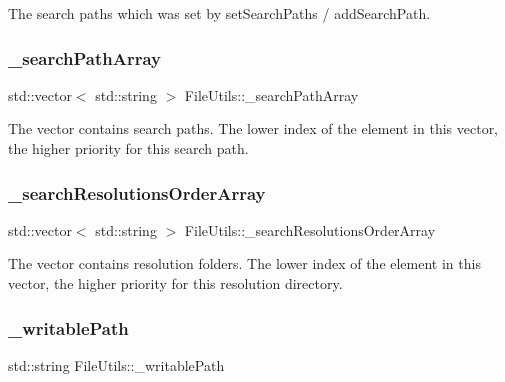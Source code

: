 The search paths which was set by \textquotesingle{}set\+Search\+Paths\textquotesingle{} / \textquotesingle{}add\+Search\+Path\textquotesingle{}. \mbox{\label{classFileUtils_a856a6d415b5bca3399d826e13ce23501}} 
\subsubsection{\texorpdfstring{\+\_\+search\+Path\+Array}{\_searchPathArray}}
{\footnotesize\ttfamily std\+::vector$<$ std\+::string $>$ File\+Utils\+::\+\_\+search\+Path\+Array\hspace{0.3cm}{\ttfamily [protected]}}

The vector contains search paths. The lower index of the element in this vector, the higher priority for this search path. \mbox{\label{classFileUtils_a35a01013ca9bcbb04c7ae1cd43fbe572}} 
\subsubsection{\texorpdfstring{\+\_\+search\+Resolutions\+Order\+Array}{\_searchResolutionsOrderArray}}
{\footnotesize\ttfamily std\+::vector$<$ std\+::string $>$ File\+Utils\+::\+\_\+search\+Resolutions\+Order\+Array\hspace{0.3cm}{\ttfamily [protected]}}

The vector contains resolution folders. The lower index of the element in this vector, the higher priority for this resolution directory. \mbox{\label{classFileUtils_a58acf8f0cf86958ed5a6975363b3abe5}} 
\subsubsection{\texorpdfstring{\+\_\+writable\+Path}{\_writablePath}}
{\footnotesize\ttfamily std\+::string File\+Utils\+::\+\_\+writable\+Path\hspace{0.3cm}{\ttfamily [protected]}}

